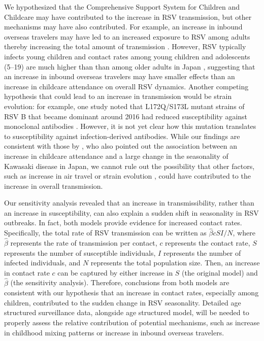 \documentclass[12pt]{article}
\begin{document}
We hypothesized that the Comprehensive Support System for Children and Childcare may have contributed to the increase in RSV transmission, but other mechanisms may have also contributed.
For example, an increase in inbound overseas travelers may have led to an increased exposure to RSV among adults thereby increasing the total amount of transmission \citep{wagatsuma2021shifts}.
However, RSV typically infects young children \citep{matsumura2025epidemiology} and contact rates among young children and adolescents (5--19) are much higher than than among older adults in Japan \citep{munasinghe2019quantifying}, suggesting that an increase in inbound overseas travelers may have smaller effects than an increase in childcare attendance on overall RSV dynamics.
Another competing hypothesis that could lead to an increase in transmission would be strain evolution:
for example, one study noted that L172Q/S173L mutant strains of RSV B that became dominant around 2016 had reduced susceptibility against monoclonal antibodies \citep{okabe2024amino}.
However, it is not yet clear how this mutation translates to susceptibility against infection-derived antibodies.
While our findings are consistent with those by \cite{dehaan2024age}, who also pointed out the association between an increase in childcare attendance and a large change in the seasonality of Kawasaki disease in Japan, we cannot rule out the possibility that other factors, such as increase in air travel \citep{wagatsuma2021shifts} or strain evolution \citep{okabe2024amino}, could have contributed to the increase in overall transmission.

Our sensitivity analysis revealed that an increase in transmissibility, rather than an increase in susceptibility, can also explain a sudden shift in seasonality in RSV outbreaks.
In fact, both models provide evidence for increased contact rates.
Specifically, the total rate of RSV transmission can be written as $\hat{\beta} c S I/N$, where $\hat{\beta}$ represents the rate of transmission per contact, $c$ represents the contact rate, $S$ represents the number of susceptible individuals, $I$ represents the number of infected individuals, and $N$ represents the total population size.
Then, an increase in contact rate $c$ can be captured by either increase in $S$ (the original model) and $\hat{\beta}$ (the sensitivity analysis).
Therefore, conclusions from both models are consistent with our hypothesis that an increase in contact rates, especially among children, contributed to the sudden change in RSV seasonality.
Detailed age structured surveillance data, alongside age structured model, will be needed to properly assess the relative contribution of potential mechanisms, such as increase in childhood mixing patterns or increase in inbound overseas travelers.
\end{document}
